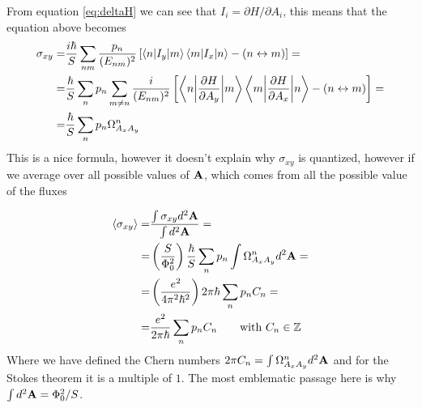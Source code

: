From equation \ref{eq:deltaH} we can see that $I_i=\partial H/\partial A_i$, this means that the equation above becomes
\begin{equation}
    \begin{split}
        \sigma_{xy}=&
        \frac{i\hbar}S\sum_{nm}\frac{p_n}{(E_{nm})^2}\left[
        \braket{n|I_y}{m}\braket{m|I_x}{n} - (n\leftrightarrow m)
    \right]=\\
    =&\frac \hbar S\sum_{n}p_n\sum_{m\neq n}\frac{i}{(E_{nm})^2}\left[
    \braket{n\bigg|\frac{\partial H}{\partial A_y}}{m}\braket{m\bigg|\frac{\partial H}{\partial A_x}}{n} - (n\leftrightarrow m)
    \right]=\\
    =&\frac \hbar S\sum_{n}p_n\Omega^n_{A_xA_y}
    \end{split}
\end{equation}
This is a nice formula, however it doesn't explain why $\sigma_{xy}$ is quantized, however if we average over all possible values of $\mathbf{A}$, which comes from all the possible value of the fluxes

\begin{equation}
    \begin{split}
        \langle\sigma_{xy}\rangle=&
        \frac{\int \sigma_{xy}d^2\mathbf{A}}{\int d^2\mathbf{A}}=\\
        =&\left(\frac{S}{\Phi_0^2}\right)\frac \hbar S\sum_np_n\int \Omega^n_{A_xA_y}d^2\mathbf{A} =\\
        =&\left(\frac{e^2}{4\pi^2\hbar^2}\right)2\pi\hbar\sum_np_nC_n=\\
        =&\frac{e^2}{2\pi\hbar}\sum_np_nC_n\quad \quad \text{with }C_n\in \mathbb Z
    \end{split}
\end{equation}
Where we have defined the Chern numbers $2\pi C_n=\int \Omega^n_{A_xA_y}d^2\mathbf{A}$ and for the Stokes theorem it is a multiple of $1$. The most emblematic passage here is why $\int d^2\mathbf{A}=\Phi_0^2/S$.\\
